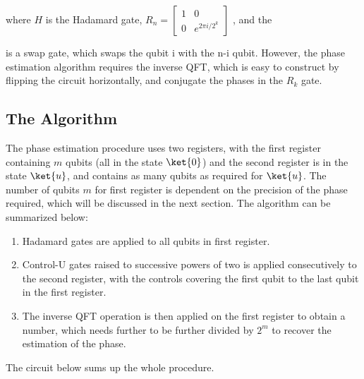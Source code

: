 \documentclass{article}
\begin{document}
where $H$ is the Hadamard gate, \(R_n = 
\begin{bmatrix}
    1 & 0 \\
    0 & e^{2\pi i/2^k}
\end{bmatrix} \)
, and the  is a swap gate, which swaps the qubit i with the n-i qubit. However, the phase estimation algorithm requires the inverse QFT, which is easy to construct by flipping the circuit horizontally, and conjugate the phases in the $R_k$ gate.
\pagebreak
\subsection{The Algorithm}
The phase estimation procedure uses two registers, with the first register containing $m$ qubits (all in the state $\ket{0}$) and the second register is in the state $\ket{u}$, and contains as many qubits as required for $\ket{u}$. The number of qubits $m$ for first register is dependent on the precision of the phase required, which will be discussed in the next section. The algorithm can be summarized below:
\begin{enumerate}
    \item Hadamard gates are applied to all qubits in first register.
    \item Control-U gates raised to successive powers of two is applied consecutively to the second register, with the controls covering the first qubit to the last qubit in the first register.
    \item The inverse QFT operation is then applied on the first register to obtain a number, which needs further to be further divided by $2^m$ to recover the estimation of the phase.
\end{enumerate}
The circuit below sums up the whole procedure.
\vspace{5mm}
\end{document}
